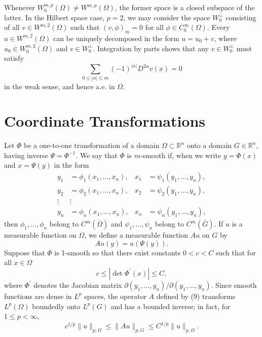 \begin{para}
  Whenever $W_0^{m, p}(\Omega) \neq W^{m,p}(\Omega)$, the former space is a closed subspace of 
  the latter. In the Hilbert space case, $p=2$, we may consider the space $W_0^{\perp}$ consisting 
  of all $v \in W^{m, 2}(\Omega)$ such that $(v, \phi)_m=0$ for all $\phi \in C_0^{\infty}(\Omega)$.
  Every $u \in W^{m, 2}(\Omega)$ can be uniquely decomposed in the form $u=u_0+v$,
  where $u_0 \in W_0^{m, 2}(\Omega)$ and $v \in W_0^{\perp}$.
  Integration by parts shows that any $v \in W_0^{\perp}$ must satisfy
  \[
  \sum_{0 \leq|\alpha| \leq m}(-1)^{|\alpha|} D^{2 \alpha} v(x)=0
  \]
  in the weak sense, and hence a.e. in $\Omega$.
\end{para}


\section{Coordinate Transformations}

\begin{para}
  Let $\Phi$ be a one-to-one transformation of a domain $\Omega \subset \mathbb{R}^n$ onto
  a domain $G \in \mathbb{R}^n$, having inverse $\Psi=\Phi^{-1}$.
  We say that $\Phi$ is $m$-smooth if, when we write $y=\Phi(x)$ and $x=\Psi(y)$ in the form
  \[
  \begin{aligned}
  y_1 & =\phi_1\left(x_1, \ldots, x_n\right), & x_1 & =\psi_1\left(y_1, \ldots, y_n\right), \\
  y_2 & =\phi_2\left(x_1, \ldots, x_n\right), & x_2 & =\psi_2\left(y_1, \ldots, y_n\right), \\
  \vdots & \vdots & & \\
  y_n & =\phi_n\left(x_1, \ldots, x_n\right), & x_n & =\psi_n\left(y_1, \ldots, y_n\right),
  \end{aligned}
  \]
  then $\phi_1, \ldots, \phi_n$ belong to $C^m(\overline{\Omega})$ and $\psi_1, \ldots, \psi_n$
  belong to $C^m(\bar{G})$.
  If $u$ is a measurable function on $\Omega$, we define a measurable function $A u$ on $G$ by
  \begin{equation}\label{eq:3.9}
    A u(y)=u(\Psi(y)) .
  \end{equation}
  Suppose that $\Phi$ is 1-smooth so that there exist constants $0<c<C$ such that
  for all $x \in \Omega$
  \begin{equation}\label{eq:3.10}
    c \leq\left|\det \Phi^{\prime}(x)\right| \leq C,
  \end{equation}
  where $\Phi^{\prime}$ denotes the Jacobian matrix $\partial\left(y_1, \ldots, y_n\right) / \partial\left(y_1, \ldots, y_n\right)$.
  Since smooth functions are dense in $L^p$ spaces, the operator $A$ defined by (9)
  transforms $L^p(\Omega)$ boundedly onto $L^p(G)$ and has a bounded inverse;
  in fact, for $1 \leq p<\infty$,
  \[
  c^{1 / p}\|u\|_{p, \Omega} \leq\|A u\|_{p, G} \leq C^{1 / p}\|u\|_{p, \Omega} .
  \]
\end{para}


